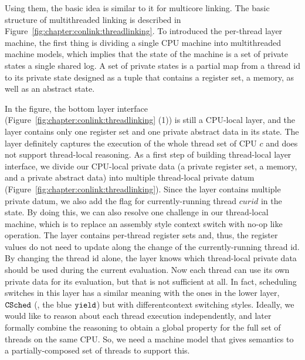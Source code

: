 Using them, the basic idea is similar to it for multicore linking. 
The basic structure of multithreaded linking is described in Figure~\ref{fig:chapter:conlink:threadlinking}.
To introduced the per-thread layer machine, 
the first thing is dividing a single CPU machine into multithreaded machine models,
which implies that the state of the machine is 
a set of private states a single shared log. 
A set of private states is a partial map from a thread id to its private state designed as a tuple that contains 
a register set, a memory, as well as an abstract state. 

In the figure, the bottom layer interface (\cf Figure~\ref{fig:chapter:conlink:threadlinking} (1)) is still a CPU-local layer,
and the layer contains only one register set and one private abstract data in its state.
The layer definitely captures the execution of the whole thread set of CPU $c$ 
and does not support thread-local reasoning.
As a first step of building thread-local layer interface, 
we divide our CPU-local private data (a private register set, a memory, and a private abstract data) into multiple thread-local
private datum (Figure~\ref{fig:chapter:conlink:threadlinking}). 
Since the layer contains multiple private datum, we also add the flag for currently-running thread $curid$ in the state. 
By doing this, we can also resolve one challenge in our thread-local machine, which is to replace an assembly style 
context switch with no-op like operation. 
The layer contains per-thread register sets and, thus, the register values do not need to update along the change of the currently-running thread id. By changing the thread id alone, the layer knows which thread-local private data should be 
used during the current evaluation.
Now each thread can use its own private data for its evaluation, but that is not sufficient at all. 
In fact, scheduling switches in this layer has a similar meaning with the ones in the lower layer, 
${{\mathrm{\texttt{CSched}}}}$ (\ie, the blue ${\mathrm{\texttt{yield}}}$) but with differentcontext switching styles.
Ideally, we would like to reason about each thread execution 
independently, and later formally combine the reasoning to obtain a global
property for the full set of threads on the same CPU.
So, we need a machine model that gives semantics to
a partially-composed set of threads to support this.

